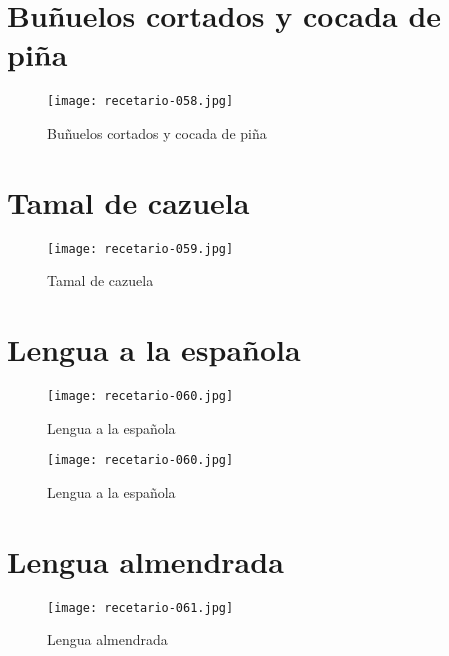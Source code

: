 \documentclass[12pt,letterpaper]{article}
\begin{document}
\newpage

\section{Buñuelos cortados y cocada de piña}
  \begin{figure}[H]
    \vspace{2pt}
  \texttt{[image: recetario-058.jpg]}
    \caption{Buñuelos cortados y cocada de piña}
    
  \end{figure}

\newpage

\section{Tamal de cazuela}
  \begin{figure}[H]
    \vspace{2pt}
  \texttt{[image: recetario-059.jpg]}
    \caption{Tamal de cazuela}
    
  \end{figure}

\newpage

\section{Lengua a la española}
  \begin{figure}[H]
    \vspace{2pt}
  \texttt{[image: recetario-060.jpg]}
    \caption{Lengua a la española}
    
  \end{figure}

\newpage


  \begin{figure}[H]
    \vspace{2pt}
  \texttt{[image: recetario-060.jpg]}
    \caption{Lengua a la española}
    
  \end{figure}

\newpage

\section{Lengua almendrada}
  \begin{figure}[H]
    \vspace{2pt}
  \texttt{[image: recetario-061.jpg]}
    \caption{Lengua almendrada}
    
  \end{figure}
\end{document}
